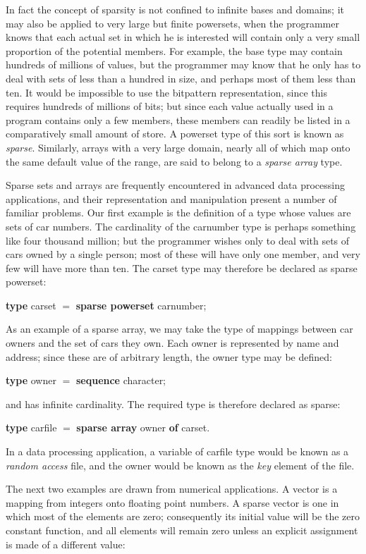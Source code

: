 In fact the concept of sparsity is not confined to infinite bases and domains; it may also be applied to very large but finite powersets, when the programmer knows that each actual set in which he is interested will contain only a very small proportion of the potential members. For example, the base type may contain hundreds of millions of values, but the programmer may know that he only has to deal with sets of less than a hundred in size, and perhaps most of them less than ten. It would be impossible to use the bitpattern representation, since this requires hundreds of millions of bits; but since each value actually used in a program contains only a few members, these members can readily be listed in a comparatively small amount of store. A powerset type of this sort is known as \textit{sparse}. Similarly, arrays with a very large domain, nearly all of which map onto the same default value of the range, are said to belong to a \textit{sparse array} type.

Sparse sets and arrays are frequently encountered in advanced data processing applications, and their representation and manipulation present a number of familiar problems. Our first example is the definition of a type whose values are sets of car numbers. The cardinality of the carnumber type is perhaps something like four thousand million; but the programmer wishes only to deal with sets of cars owned by a single person; most of these will have only one member, and very few will have more than ten. The carset type may therefore be declared as sparse powerset:

\quad \textbf{type} carset $=$ \textbf{sparse powerset} carnumber;

As an example of a sparse array, we may take the type of mappings between car owners and the set of cars they own. Each owner is represented by name and address; since these are of arbitrary length, the owner type may be defined:

\quad \textbf{type} owner $=$ \textbf{sequence} character;

\noindent
and has infinite cardinality. The required type is therefore declared as sparse:

\quad \textbf{type} carfile $=$ \textbf{sparse array} owner \textbf{of} carset.

In a data processing application, a variable of carfile type would be known as a \textit{random access} file, and the owner would be known as the \textit{key} element of the file.

The next two examples are drawn from numerical applications. A vector is a mapping from integers onto floating point numbers. A sparse vector is one in which most of the elements are zero; consequently its initial value will be the zero constant function, and all elements will remain zero unless an explicit assignment is made of a different value:

